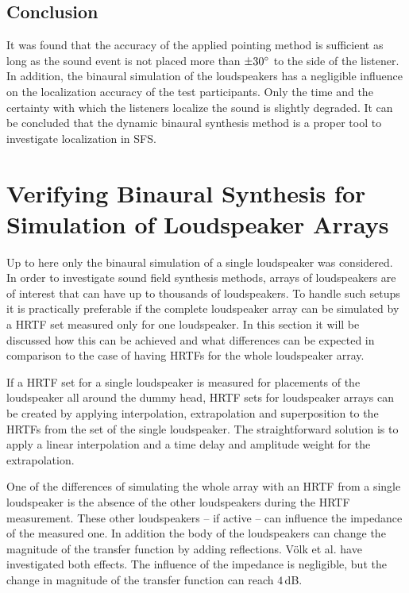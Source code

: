 \subsection{Conclusion}
%
It was found that the accuracy of the applied pointing method is
sufficient as long as the sound event is not placed more than $\pm 30^\circ$ to the
side of the listener. In addition, the binaural simulation of the loudspeakers
has a negligible influence on the localization accuracy of the test
participants. Only the time
and the certainty with which the listeners localize the sound is slightly
degraded.
It can be concluded that the dynamic binaural synthesis method is a proper tool
to investigate localization in \ac{SFS}.

\newpage

\section[Simulation of Loudspeaker Arrays]{Verifying Binaural Synthesis for Simulation of Loudspeaker
Arrays\autocite[Parts of this section are published in][]{Wierstorf2012}}
\label{sec:verifying_binaural_synthesis_for_simulation_of_loudspeaker_arrays}
%
Up to here only the binaural simulation of a single loudspeaker was considered.
In order to investigate sound field synthesis methods, arrays of
loudspeakers are of interest that can have up to thousands of loudspeakers. To
handle such setups it is practically preferable if the complete loudspeaker
array can be
simulated by a \ac{HRTF} set measured only for one loudspeaker. In this section it
will be discussed how this can be achieved and what differences can be expected
in comparison to the case of having \acp{HRTF} for the whole loudspeaker array.

If a \ac{HRTF} set for a single loudspeaker is measured for placements of the
loudspeaker all around the dummy head, \ac{HRTF} sets for loudspeaker arrays can be
created by applying interpolation, extrapolation and superposition
to the \acp{HRTF} from the set of
the single loudspeaker. The straightforward solution is to apply a linear interpolation
and a time delay and amplitude weight for the extrapolation.

One of the differences of simulating the whole array with an \ac{HRTF} from a single
loudspeaker is the absence of the other loudspeakers during the \ac{HRTF} measurement.
These other loudspeakers -- if active -- can influence the impedance
of the measured one. In addition the body of the loudspeakers can change 
the magnitude of the transfer function by adding reflections.
Völk et al.\autocite{Volk2010c} have investigated both effects. The influence of
the impedance is negligible, but the change in magnitude of the transfer
function can reach $4$\,dB.

